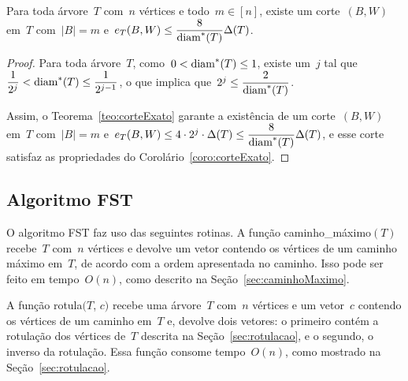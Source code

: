 	\bigskip
	\bigskip

	\begin{coro}
	\label{coro:corteExato}
		Para toda árvore~$T$ com~$n$ vértices e todo~${m\in[n]}$, existe
		um corte~$(B,W)$ em~$T$ com~${|B|=m}$ 
		e~${e_T(B,W)\le \dfrac{8}{\mathrm{diam}^*(T)}\Delta(T)}$.
	\end{coro}

	\begin{proof}
		Para toda árvore~$T$,
		como~$0<\mathrm{diam}^*(T)\le 1$,
		existe um~$j$ tal
		que~${\dfrac{1}{2^j}}<\mathrm{diam}^*(T)\le \dfrac{1}{2^{j-1}}$,
		o que implica que~${2^j\le\dfrac{2}{\mathrm{diam}^*(T)}}$.

		Assim, o Teorema~\ref{teo:corteExato} garante a existência de um 
		corte~$(B,W)$ em~$T$ com~${|B|=m}$ 
		e~$e_T(B,W)\le 4\cdot 2^j\cdot\Delta(T)\le \dfrac{8}{\mathrm{diam}^*(T)} \Delta(T)$,
		e esse corte satisfaz as propriedades do 
		Corolário~\ref{coro:corteExato}. 
	\end{proof}

	\bigskip
	\bigskip
	\bigskip
	\bigskip
	\bigskip

	\subsection{Algoritmo FST}

		O algoritmo FST faz uso das seguintes rotinas.
		A função {\sc caminho\_máximo}$(T)$ 
		recebe~$T$ com~$n$ vértices e
		devolve um vetor contendo os vértices de um caminho 
		máximo em~$T$, de acordo com a ordem apresentada no caminho.
		Isso pode ser feito em tempo~$O(n)$, como descrito na 
		Seção~\ref{sec:caminhoMaximo}.

		A função {\sc rotula}$(T$, $c)$ recebe uma árvore~$T$ com~$n$ vértices 
		e um vetor~$c$
		contendo os vértices de um caminho em~$T$ e,
		devolve dois vetores: o primeiro contém a rotulação dos vértices 
		de~$T$
		descrita na Seção~\ref{sec:rotulacao}, e o segundo, o inverso
		da rotulação. 
		Essa função consome tempo~$O(n)$, como mostrado na 
		Seção~\ref{sec:rotulacao}.

